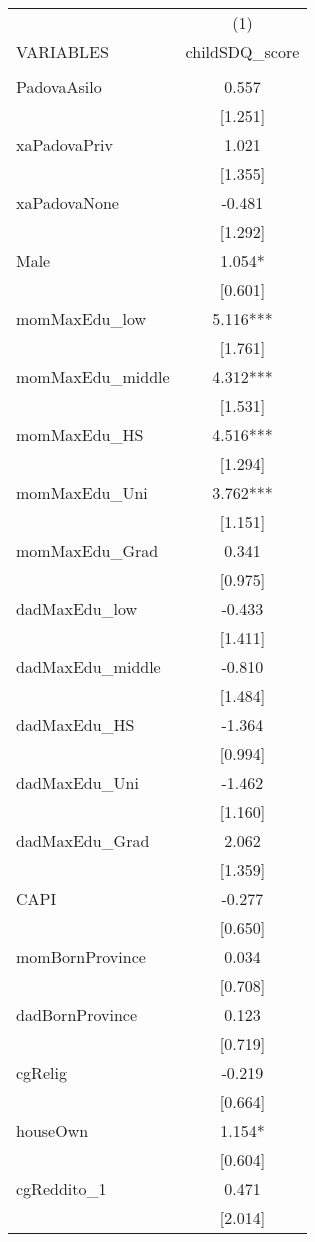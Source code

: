 \documentclass[]{article}
\begin{document}
\begin{tabular}{lc} \hline
 & (1) \\
VARIABLES & childSDQ\_score \\ \hline
 &  \\
PadovaAsilo & 0.557 \\
 & [1.251] \\
xaPadovaPriv & 1.021 \\
 & [1.355] \\
xaPadovaNone & -0.481 \\
 & [1.292] \\
Male & 1.054* \\
 & [0.601] \\
momMaxEdu\_low & 5.116*** \\
 & [1.761] \\
momMaxEdu\_middle & 4.312*** \\
 & [1.531] \\
momMaxEdu\_HS & 4.516*** \\
 & [1.294] \\
momMaxEdu\_Uni & 3.762*** \\
 & [1.151] \\
momMaxEdu\_Grad & 0.341 \\
 & [0.975] \\
dadMaxEdu\_low & -0.433 \\
 & [1.411] \\
dadMaxEdu\_middle & -0.810 \\
 & [1.484] \\
dadMaxEdu\_HS & -1.364 \\
 & [0.994] \\
dadMaxEdu\_Uni & -1.462 \\
 & [1.160] \\
dadMaxEdu\_Grad & 2.062 \\
 & [1.359] \\
CAPI & -0.277 \\
 & [0.650] \\
momBornProvince & 0.034 \\
 & [0.708] \\
dadBornProvince & 0.123 \\
 & [0.719] \\
cgRelig & -0.219 \\
 & [0.664] \\
houseOwn & 1.154* \\
 & [0.604] \\
cgReddito\_1 & 0.471 \\
 & [2.014] \\

\end{tabular}
\end{document}
